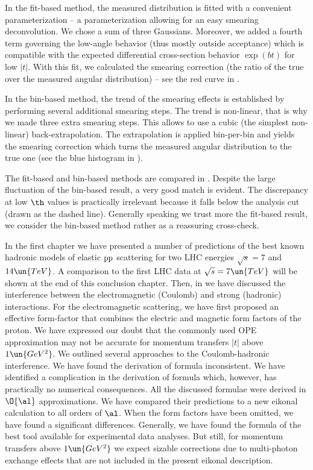 In the fit-based method, the measured distribution is fitted with a convenient parameterization -- a parameterization allowing for an easy smearing deconvolution. We chose a sum of three Gaussians. Moreover, we added a fourth term governing the low-angle behavior (thus mostly outside acceptance) which is compatible with the expected differential cross-section behavior $\exp(bt)$ for low $|t|$. With this fit, we calculated the smearing correction (the ratio of the true over the measured angular distribution) -- see the red curve in .

In the bin-based method, the trend of the smearing effects is established by performing several additional smearing steps. The trend is non-linear, that is why we made three extra smearing steps. This allows to use a cubic (the simplest non-linear) back-extrapolation. The extrapolation is applied bin-per-bin and yields the smearing correction which turns the measured angular distribution to the true one (see the blue histogram in ).

The fit-based and bin-based methods are compared in . Despite the large fluctuation of the bin-based result, a very good match is evident. The discrepancy at low $\th$ values is practically irrelevant because it falls below the analysis cut (drawn as the dashed line). Generally speaking we trust more the fit-based result, we consider the bin-based method rather as a reassuring cross-check.


In the first chapter we have presented a number of predictions of the best known hadronic models of elastic $\rm pp$ scattering for two LHC energies $\sqrt s = 7$ and $14\un{TeV}$. A comparison to the first LHC data at $\sqrt s = 7\un{TeV}$ will be shown at the end of this conclusion chapter. Then, in  we have discussed the interference between the electromagnetic (Coulomb) and strong (hadronic) interactions. For the electromagnetic scattering, we have first proposed an effective form-factor that combines the electric and magnetic form factors of the proton. We have expressed our doubt that the commonly used OPE approximation may not be accurate for momentum transfers $|t|$ above $1\un{GeV^2}$. We outlined several approaches to the Coulomb-hadronic interference. We have found the derivation of \WaY{} formula inconsistent. We have identified a complication in the derivation of \KaL{} formula which, however, has practically no numerical consequences. All the discussed formulae were derived in $\O{\al}$ approximations. We have compared their predictions to a new eikonal calculation to all orders of $\al$. When the form factors have been omitted, we have found a significant differences. Generally, we have found the formula of \KaL{} the best tool available for experimental data analyses. But still, for momentum transfers above $1\un{GeV^2}$ we expect sizable corrections due to multi-photon exchange effects that are not included in the present eikonal description.

